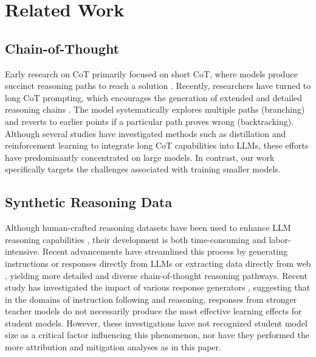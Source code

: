 \section{Related Work}

\subsection{Chain-of-Thought}

Early research on CoT primarily focused on short CoT, where models produce succinct reasoning paths to reach a solution \citep{lambert2025tulu3pushingfrontiers, longpre2023flancollectiondesigningdata, wei2023chainofthoughtpromptingelicitsreasoning, yu2024metamathbootstrapmathematicalquestions}.
Recently, researchers have turned to long CoT prompting, which encourages the generation of extended and detailed reasoning chains 
\citep{DeepSeekAI2025DeepseekR1, hou2025advancinglanguagemodelreasoning, kimi2025k15, sky_t1_2025, openai2024learning, tinyzero, zeng2025simplerl}. 
The model systematically explores multiple paths (branching) and reverts to earlier points if a particular path proves wrong (backtracking). Although several studies have investigated methods such as distillation and reinforcement learning to integrate long CoT capabilities into LLMs, these efforts have predominantly concentrated on large models. In contrast, our work specifically targets the challenges associated with training smaller models.


\subsection{Synthetic Reasoning Data}
Although human-crafted reasoning datasets have been used to enhance LLM reasoning capabilities \cite{hendrycks2021measuringmathematicalproblemsolving, numina_math_datasets}, their development is both time-consuming and labor-intensive. 
Recent advancements have streamlined this process by generating instructions or responses directly from LLMs \citep{hui2024smallerlanguagemodelsbetter, toshniwal2024openmathinstruct2acceleratingaimath, xu2024magpiealignmentdatasynthesis, yue2023mammothbuildingmathgeneralist, zhang2025bestinstructiontuningdatafit} or extracting data directly from web \citep{paster2023openwebmathopendatasethighquality, yue2024mammoth2scalinginstructionsweb}, yielding more detailed and diverse chain-of-thought reasoning pathways. Recent study has investigated the impact of various response generators \citep{kim2024evaluatinglanguagemodelssynthetic}, suggesting that in the domains of instruction following and reasoning, responses from stronger teacher models do not necessarily produce the most effective learning effects for student models. However, these investigations have not recognized student model size as a critical factor influencing this phenomenon, nor have they performed the more attribution and mitigation analyses as in this paper.
